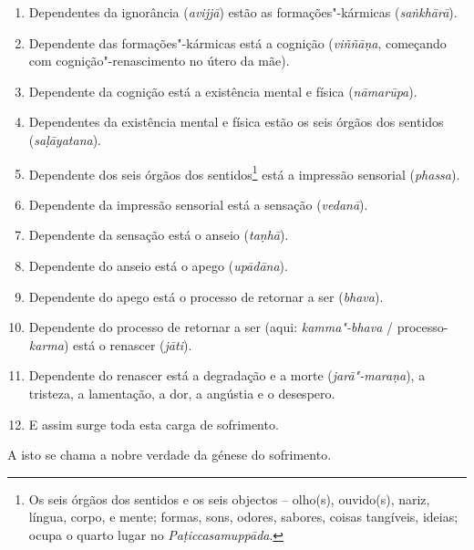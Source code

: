 \begin{enumerate}

  \item Dependentes da ignorância (\emph{avijjā}) estão as formações"-kármicas
        (\emph{saṅkhārā}).

  \item Dependente das formações"-kármicas está a cognição (\emph{viññāṇa},
        começando com cognição"-renascimento no útero da mãe).

  \item Dependente da cognição está a existência mental e física
        (\emph{nāmarūpa}).

  \item Dependentes da existência mental e física estão os seis órgãos dos
        sentidos (\emph{saḷāyatana}).

  \item Dependente dos seis órgãos dos sentidos\footnote{Os seis órgãos dos
        sentidos e os seis objectos -- olho(s), ouvido(s), nariz, língua, corpo,
        e mente; formas, sons, odores, sabores, coisas tangíveis, ideias; ocupa
        o quarto lugar no \emph{Paṭiccasamuppāda}.} está a impressão sensorial
        (\emph{phassa}).

  \item Dependente da impressão sensorial está a sensação (\emph{vedanā}).

  \item Dependente da sensação está o anseio (\emph{taṇhā}).

  \item Dependente do anseio está o apego (\emph{upādāna}).

  \item Dependente do apego está o processo de retornar a ser (\emph{bhava}).

  \item Dependente do processo de retornar a ser (aqui: \emph{kamma"-bhava} /
        processo-\emph{karma}) está o renascer (\emph{jāti}).

  \item Dependente do renascer está a degradação e a morte (\emph{jarā"-maraṇa}),
        a tristeza, a lamentação, a dor, a angústia e o desespero.

  \item E assim surge toda esta carga de sofrimento.

\end{enumerate}

A isto se chama a nobre verdade da génese do sofrimento.


